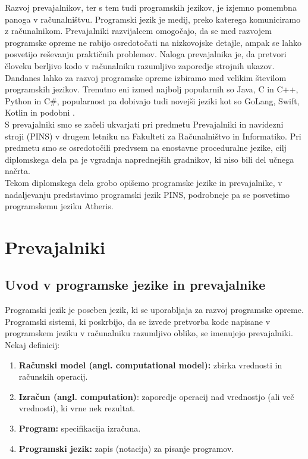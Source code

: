\documentclass[a4paper, 12p]{book}
\begin{document}
Razvoj prevajalnikov, ter s tem tudi programskih jezikov, je izjemno pomembna panoga v računalništvu. Programski jezik je medij, preko katerega komuniciramo z računalnikom. Prevajalniki razvijalcem omogočajo, da se med razvojem programske opreme ne rabijo osredotočati na nizkovojske detajle, ampak se lahko posvetijo reševanju praktičnih problemov. Naloga prevajalnika je, da pretvori človeku berljivo kodo v računalniku razumljivo zaporedje strojnih ukazov. \\
\indent Dandanes lahko za razvoj programske opreme izbiramo med velikim številom programskih jezikov. Trenutno eni izmed najbolj popularnih so Java, C in C++, Python in C\#, popularnost pa dobivajo tudi novejši jeziki kot so GoLang, Swift, Kotlin in podobni \cite{tiobeIndex}. \\
\indent S prevajalniki smo se začeli ukvarjati pri predmetu Prevajalniki in navidezni stroji (PINS) v drugem letniku na Fakulteti za Računalništvo in Informatiko. Pri predmetu smo se osredotočili predvsem na enostavne proceduralne jezike, cilj diplomskega dela pa je vgradnja naprednejših gradnikov, ki niso bili del učnega načrta. \\
\indent Tekom diplomskega dela grobo opišemo programske jezike in prevajalnike, v nadaljevanju predstavimo programski jezik PINS, podrobneje pa se posvetimo programskemu jeziku Atheris.

\chapter{Prevajalniki}
\label{ch0}

\section{Uvod v  programske jezike in prevajalnike}

Programski jezik je poseben jezik, ki se uporabljaja za razvoj programske opreme. Programski sistemi, ki poskrbijo, da se izvede pretvorba kode napisane v programskem jeziku v računalniku razumljivo obliko, se imenujejo prevajalniki. \\
Nekaj definicij:
\begin{enumerate}  
	\item \textbf{Računski model (angl. computational model):} zbirka vrednosti in računskih operacij.
	\item \textbf{Izračun (angl. computation)}: zaporedje operacij nad vrednostjo (ali več vrednosti), ki vrne nek rezultat.
	\item \textbf{Program:} specifikacija izračuna.
	\item \textbf{Programski jezik:} zapis (notacija) za pisanje programov.
\end{enumerate}
\end{document}
